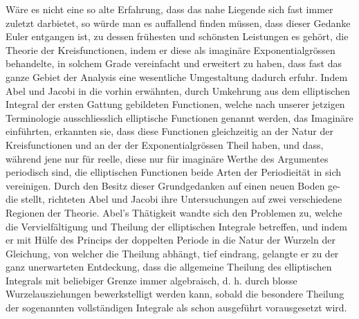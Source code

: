 \documentclass[11pt]{article}
\begin{document}
Wäre es nicht eine so alte Erfahrung, dass das nahe Liegende sich fast immer zuletzt darbietet, so würde man es auffallend finden müssen, dass dieser Gedanke Euler entgangen ist, zu dessen frühesten und schönsten Leistungen es gehört, die Theorie der Kreisfunctionen, indem er diese als imaginäre Exponentialgrössen behandelte, in solchem Grade vereinfacht und erweitert zu haben, dass fast das ganze Gebiet der Analysis eine wesentliche Umgestaltung dadurch erfuhr. Indem Abel und Jacobi in die vorhin erwähnten, durch Umkehrung aus dem elliptischen Integral der ersten Gattung gebildeten Functionen, welche nach unserer jetzigen Terminologie ausschliesslich elliptische Functionen genannt werden, das Imaginäre einführten, erkannten sie, dass diese Functionen gleichzeitig an der Natur der Kreisfunctionen und an der der Exponentialgrössen Theil haben, und dass, während jene nur für reelle, diese nur für imaginäre Werthe des Argumentes periodisch sind, die elliptischen Functionen beide Arten der Periodieität in sich vereinigen. Durch den Besitz dieser Grundgedanken auf einen neuen Boden ge- die
stellt, richteten Abel und Jacobi ihre Untersuchungen auf zwei verschiedene Regionen der Theorie. Abel’s Thätigkeit wandte sich den Problemen zu, welche die Vervielfältigung und Theilung der elliptischen Integrale betreffen, und indem er mit Hülfe des Princips der doppelten Periode in die Natur der Wurzeln der Gleichung, von welcher die Theilung abhängt, tief eindrang, gelangte er zu der ganz unerwarteten Entdeckung, dass die allgemeine Theilung des elliptischen Integrals mit beliebiger Grenze immer algebraisch, d. h. durch blosse Wurzelausziehungen bewerkstelligt werden kann, sobald die besondere Theilung der sogenannten vollständigen Integrale als schon ausgeführt vorausgesetzt wird.
\end{document}
